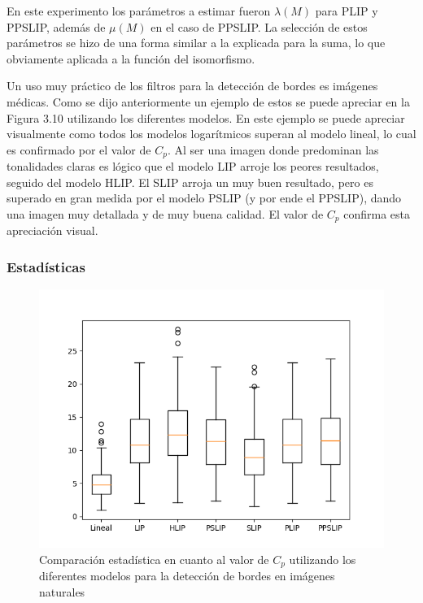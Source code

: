 En este experimento los par\'ametros a estimar fueron $\lambda(M)$ para PLIP y PPSLIP, adem\'as de $\mu(M)$ en el caso de PPSLIP. La selecci\'on de estos par\'ametros se hizo de una forma similar a la explicada para la suma, lo que obviamente aplicada a la funci\'on del isomorfismo.

Un uso muy pr\'actico de los filtros para la detecci\'on de bordes es im\'agenes m\'edicas. Como se dijo anteriormente un ejemplo de estos se puede apreciar en la Figura 3.10 utilizando los diferentes modelos. En este ejemplo se puede apreciar visualmente como todos los modelos logar\'itmicos superan al modelo lineal, lo cual es confirmado por el valor de $C_p$. Al ser una imagen donde predominan las tonalidades claras es l\'ogico que el modelo LIP arroje los peores resultados, seguido del modelo HLIP. El SLIP arroja un muy buen resultado, pero es superado en gran medida por el modelo PSLIP (y por ende el PPSLIP), dando una imagen muy detallada y de muy buena calidad. El valor de $C_p$ confirma esta apreciaci\'on visual.

\subsubsection{Estad\'isticas}

\begin{figure}
	\begin{center}
		\includegraphics[width=10.0 cm]{images/graphics/natural/ed/ed_all.png}
		\caption{Comparaci\'on estad\'istica en cuanto al valor de $C_p$ utilizando los diferentes modelos para la detecci\'on de bordes en im\'agenes naturales}
	\end{center}
\end{figure}

